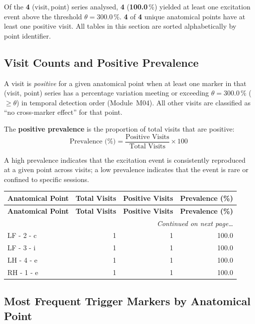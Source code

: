 \documentclass[a4paper,11pt]{article}
\begin{document}
\noindent
Of the \textbf{4} (visit,\,point) series analysed,
\textbf{4} (\textbf{100.0}\,\%) yielded at least one
excitation event above the threshold $\theta = 300.0\,\%$.
\textbf{4} of \textbf{4} unique anatomical points
have at least one positive visit.
All tables in this section are sorted alphabetically by point identifier.

\subsection{Visit Counts and Positive Prevalence}

A visit is \emph{positive} for a given anatomical point when at least one marker in that
(visit, point) series has a percentage variation meeting or exceeding
$\theta = 300.0\,\%$ ($\geq \theta$) in temporal detection order (Module~M04).
All other visits are classified as ``no cross-marker effect'' for that point.

The \textbf{positive prevalence} is the proportion of total visits that are positive:
\[
  \text{Prevalence (\%)} = \frac{\text{Positive Visits}}{\text{Total Visits}} \times 100
\]

A high prevalence indicates that the excitation event is consistently reproduced at a given
point across visits; a low prevalence indicates that the event is rare or confined to
specific sessions.

\begin{small}
\begin{longtable}{p{5cm}rrr}
\toprule
\textbf{Anatomical Point} &
\textbf{Total Visits} &
\textbf{Positive Visits} &
\textbf{Prevalence (\%)} \\
\midrule
\endfirsthead
\toprule
\textbf{Anatomical Point} &
\textbf{Total Visits} &
\textbf{Positive Visits} &
\textbf{Prevalence (\%)} \\
\midrule
\endhead
\midrule
\multicolumn{4}{r}{\small\emph{Continued on next page\ldots}} \\
\endfoot
\bottomrule
\endlastfoot
LF - 2 - c & 1 & 1 & 100.0 \\
LF - 3 - i & 1 & 1 & 100.0 \\
LH - 4 - e & 1 & 1 & 100.0 \\
RH - 1 - e & 1 & 1 & 100.0 \\
\end{longtable}
\end{small}

\subsection{Most Frequent Trigger Markers by Anatomical Point}
\end{document}
